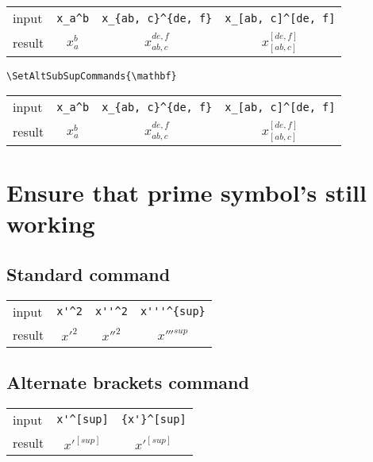 \documentclass{article}
\begin{document}
\begin{center}
  \begin{tabular}{lccc}
    \hline
    input & \verb|x_a^b| & \verb|x_{ab, c}^{de, f}|   & \verb|x_[ab, c]^[de, f]| \\
    result & $x_a^b$ & $x_{ab, c}^{de, f}$  & $x_[ab, c]^[de, f]$ \\
    \hline
  \end{tabular}
\end{center}

\begin{verbatim}
\SetAltSubSupCommands{\mathbf}
\end{verbatim}
\SetAltSubSupCommands{\mathbf}

\begin{center}
  \begin{tabular}{lccc}
    \hline
    input & \verb|x_a^b| & \verb|x_{ab, c}^{de, f}|   & \verb|x_[ab, c]^[de, f]| \\
    result & $x_a^b$ & $x_{ab, c}^{de, f}$  & $x_[ab, c]^[de, f]$ \\
    \hline
  \end{tabular}
\end{center}

\SetAltSubSupCommands{\text}

\section{Ensure that prime symbol's still working}

\subsection{Standard command}

\begin{center}
  \begin{tabular}{lccc}
    \hline
    input & \verb|x'^2| & \verb|x''^2| & \verb|x'''^{sup}| \\
    result & $x'^2$ & $x''^2$ & $x'''^{sup}$  \\
    \hline
  \end{tabular}
\end{center}

\subsection{Alternate brackets command}

\begin{center}
  \begin{tabular}{lcc}
    \hline
    input & \verb|x'^[sup]| & \verb|{x'}^[sup]| \\
    result & $x'^[sup]$ & ${x'}^[sup]$ \\
    \hline
  \end{tabular}
\end{center}
\end{document}
